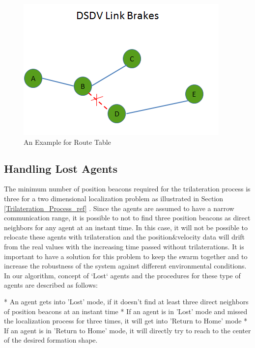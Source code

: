 \begin{figure}[H]
\caption{An Example for Route Table} \label{linkk_brake}
\centering
\includegraphics[scale = 0.65]{link_break}
\end{figure}
	
\subsection{Handling Lost Agents} \label{LostAgents}
The minimum number of position beacons required for the trilateration process is three for a two dimensional localization problem as illustrated in Section \ref{Trilateration_Process_ref} . Since the agents are assumed to have a narrow communication range, it is possible to not to find three  position beacons as direct neighbors for any agent at an instant time. In this case, it will not be possible to relocate these agents with trilateration and the position$\&$velocity data will drift from the real values with the increasing time passed without trilaterations. It is important to have a solution for this problem to keep the swarm together and to increase the robustness of the system against different environmental conditions. In our algorithm, concept of `Lost` agents and the procedures for these type of agents are described as follows:
	
	* An agent gets into 'Lost' mode, if it doesn't find at least three direct neighbors of position beacons at an instant time \newline
	* If an agent is in 'Lost' mode and missed the localization process for three times, it will get into 'Return to Home' mode \newline
	* If an agent is in 'Return to Home' mode, it will directly try to reach to the center of the desired formation shape.
		
